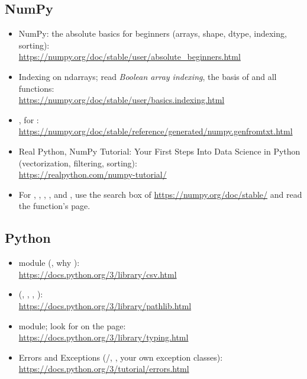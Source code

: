\documentclass{article}
\begin{document}
{\small

\subsection*{NumPy}
\begin{itemize}
\item NumPy: the absolute basics for beginners (arrays, shape, dtype,
      indexing, sorting):\\
      \url{https://numpy.org/doc/stable/user/absolute_beginners.html}
\item Indexing on ndarrays; read \emph{Boolean array indexing}, the basis of
       and all  functions:\\
      \url{https://numpy.org/doc/stable/user/basics.indexing.html}
\item {}, for :\\
      \url{https://numpy.org/doc/stable/reference/generated/numpy.genfromtxt.html}
\item Real Python, NumPy Tutorial: Your First Steps Into Data Science in Python
      (vectorization, filtering, sorting):\\
      \url{https://realpython.com/numpy-tutorial/}
\item For , , , ,
       and , use the search box of
      \url{https://numpy.org/doc/stable/} and read the function's page.
\end{itemize}

\subsection*{Python}
\begin{itemize}
\item {} module (, why ):\\
      \url{https://docs.python.org/3/library/csv.html}
\item {} (, , ,
      ):\\
      \url{https://docs.python.org/3/library/pathlib.html}
\item {} module; look for  on the page:\\
      \url{https://docs.python.org/3/library/typing.html}
\item Errors and Exceptions (/, , your own
      exception classes):\\
      \url{https://docs.python.org/3/tutorial/errors.html}
\end{itemize}

}
\end{document}
